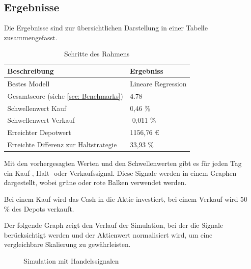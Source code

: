 \subsection{Ergebnisse}\label{sec:Ergebnisse}
Die Ergebnisse sind zur übersichtlichen Darstellung in einer Tabelle zusammengefasst.

\begin{table}[H]
    \begin{tabularx}{\textwidth}{|l|X|}
        \hline
        \rowcolor{lightgray}
        \textbf{Beschreibung} & \textbf{Ergebniss} \\ \hline
        Bestes Modell & Lineare Regression\\ \hline
        Gesamtscore (siehe \autoref{sec: Benchmarks}) & 4.78\\ \hline
        Schwellenwert Kauf & 0,46 \%\\ \hline
        Schwellenwert Verkauf & -0,011 \%\\ \hline
        Erreichter Depotwert & 1156,76 €\\ \hline
        Erreichte Differenz zur Haltstrategie & 33,93 \%\\ \hline
    \end{tabularx}
    \caption{Schritte des Rahmens}
    \label{tab:schritte_des_rahmens}
\end{table}

Mit den vorhergesagten Werten und den Schwellenwerten gibt es für jeden Tag ein Kauf-, Halt- oder Verkaufssignal. Diese Signale werden in einem Graphen dargestellt, wobei grüne oder rote Balken verwendet werden.

Bei einem Kauf wird das Cash in die Aktie investiert, bei einem Verkauf wird 50 \% des Depots verkauft. 

Der folgende Graph zeigt den Verlauf der Simulation, bei der die Signale berücksichtigt werden und der Aktienwert normalisiert wird, um eine vergleichbare Skalierung zu gewährleisten.

\begin{figure}[H]
    \centering
    \caption{Simulation mit Handelssignalen}
    \label{fig:Simulation}
\end{figure}